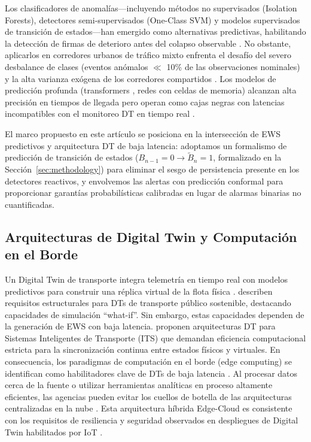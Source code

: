 \documentclass[fleqn,10pt,lineno]{wlpeerj}
\begin{document}
Los clasificadores de anomal\'ias---incluyendo m\'etodos no supervisados (Isolation Forests), detectores semi-supervisados (One-Class SVM) y modelos supervisados de transici\'on de estados---han emergido como alternativas predictivas, habilitando la detecci\'on de firmas de deterioro antes del colapso observable \citep{3}. No obstante, aplicarlos en corredores urbanos de tr\'afico mixto enfrenta el desaf\'io del severo desbalance de clases (eventos an\'omalos $\ll$ 10\% de las observaciones nominales) y la alta varianza ex\'ogena de los corredores compartidos \citep{16}. Los modelos de predicci\'on profunda (transformers \citep{19}, redes con celdas de memoria) alcanzan alta precisi\'on en tiempos de llegada pero operan como cajas negras con latencias incompatibles con el monitoreo DT en tiempo real \citep{30}.

El marco propuesto en este art\'iculo se posiciona en la intersecci\'on de EWS predictivos y arquitectura DT de baja latencia: adoptamos un formalismo de predicci\'on de transici\'on de estados ($B_{n-1}=0 \rightarrow \tilde{B}_n=1$, formalizado en la Secci\'on~\ref{sec:methodology}) para eliminar el sesgo de persistencia presente en los detectores reactivos, y envolvemos las alertas con predicci\'on conformal para proporcionar garant\'ias probabil\'isticas calibradas en lugar de alarmas binarias no cuantificadas.

\subsection{Arquitecturas de Digital Twin y Computaci\'on en el Borde}

Un Digital Twin de transporte integra telemetr\'ia en tiempo real con modelos predictivos para construir una r\'eplica virtual de la flota f\'isica \citep{22,23}. \citet{24} describen requisitos estructurales para DTs de transporte p\'ublico sostenible, destacando capacidades de simulaci\'on ``what-if''. Sin embargo, estas capacidades dependen de la generaci\'on de EWS con baja latencia. \citet{25} proponen arquitecturas DT para Sistemas Inteligentes de Transporte (ITS) que demandan eficiencia computacional estricta para la sincronizaci\'on continua entre estados f\'isicos y virtuales. En consecuencia, los paradigmas de computaci\'on en el borde (edge computing) se identifican como habilitadores clave de DTs de baja latencia \citep{26}. Al procesar datos cerca de la fuente o utilizar herramientas anal\'iticas en proceso altamente eficientes, las agencias pueden evitar los cuellos de botella de las arquitecturas centralizadas en la nube \citep{27}. Esta arquitectura h\'ibrida Edge-Cloud es consistente con los requisitos de resiliencia y seguridad observados en despliegues de Digital Twin habilitados por IoT \citep{31}.
\end{document}
